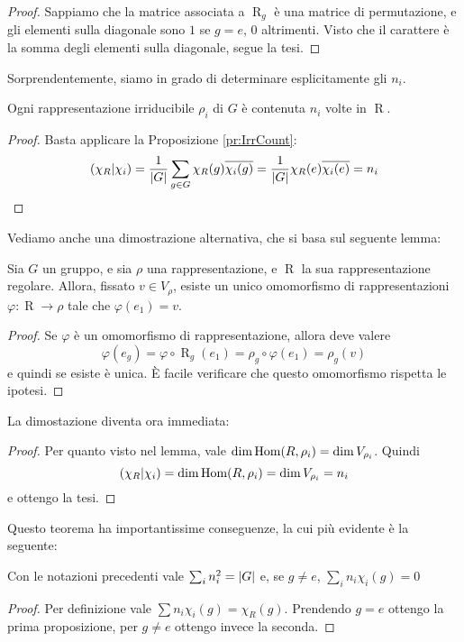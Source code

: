 \documentclass[a4paper,10pt,oneside]{math_article}
\renewcommand{\phi}{\varphi}
\newcommand{\herm}[2]{\left(#1 | #2\right)}
\DeclareMathOperator{\Reg}{R}
\let\conj\overline
\begin{document}
    \begin{proof}
      Sappiamo che la matrice associata a $\Reg_g$ è una matrice di permutazione, e gli elementi sulla diagonale sono $1$ se $g=e$, $0$ altrimenti. Visto che il carattere è la somma degli elementi sulla diagonale, segue la tesi.
    \end{proof}
    
 
    
    Sorprendentemente, siamo in grado di determinare esplicitamente gli $n_i$.
    \begin{myprop}
     Ogni rappresentazione irriducibile $\rho_i$ di $G$ è contenuta $n_i$ volte in $\Reg$.
    \end{myprop}
    
    \begin{proof}
     Basta applicare la Proposizione \ref{pr:IrrCount}:
     \[
      \herm{\chi_R}{\chi_i} = \frac1{\abs G}\sum_{g\in G} \chi_R(g)\conj{\chi_i(g)} = \frac1{\abs G}\chi_R(e)\conj{\chi_i(e)} = n_i
     \]

    \end{proof}

    Vediamo anche una dimostrazione alternativa, che si basa sul seguente lemma:
    \begin{mylemma}
      Sia $G$ un gruppo, e sia $\rho$ una rappresentazione, e $\Reg$ la sua rappresentazione regolare. Allora, fissato $v\in V_\rho$, esiste un unico omomorfismo di rappresentazioni $\phi: \Reg \rightarrow \rho$ tale che $\phi(e_1)=v$.
    \end{mylemma}
    \begin{proof}
      Se $\phi$ è un omomorfismo di rappresentazione, allora deve valere 
      \[
      \phi(e_g)=\phi \circ \Reg_g (e_1) = \rho_g \circ \phi (e_1) = \rho_g(v)
      \]
      e quindi se esiste è unica. \`E facile verificare che questo omomorfismo rispetta le ipotesi.
    \end{proof}
    
    La dimostazione diventa ora immediata:
    \begin{proof}
     Per quanto visto nel lemma, vale $\dim \operatorname{Hom}(R,\rho_i) = \dim V_{\rho_i}$. Quindi
     \[
      \herm{\chi_R}{\chi_i}= \dim \Hom(R,\rho_i) = \dim V_{\rho_i} = n_i
     \]
     e ottengo la tesi.
    \end{proof}
    
    Questo teorema ha importantissime conseguenze, la cui più evidente è la seguente:
    \begin{myprop}
     Con le notazioni precedenti vale $\sum_i n_i^2 = \left|G\right|$ e, se $g\ne e$, $\sum_i n_i \chi_i(g)=0$
    \end{myprop}
    \begin{proof}
     Per definizione vale $\sum n_i \chi_i(g) = \chi_R(g)$. Prendendo $g=e$ ottengo la prima proposizione, per $g\ne e$ ottengo invece la seconda.
    \end{proof}
\end{document}
